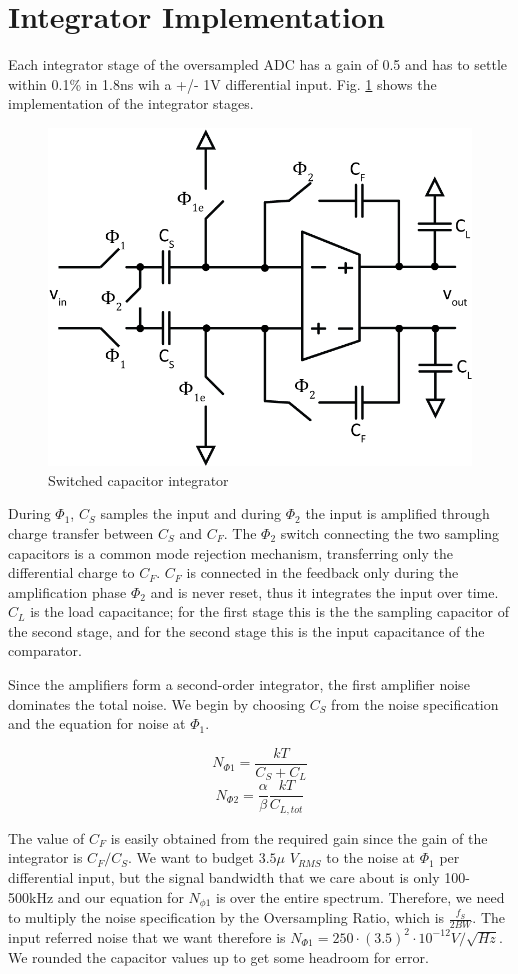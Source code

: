 \documentclass[conference]{IEEEtran}
\begin{document}
\section{Integrator Implementation}

Each integrator stage of the oversampled ADC has a gain of 0.5 and has to settle within 0.1\% in 1.8ns wih a +/- 1V differential input. Fig. \ref{fig:int} shows the implementation of the integrator stages.

\begin{figure}[h]
\centering
\includegraphics[width=0.75\linewidth]{illus/integrator}
\caption{Switched capacitor integrator}
\label{fig:int}
\end{figure}

During $\Phi_1$, $C_S$ samples the input and during $\Phi_2$ the input is amplified through charge transfer between $C_S$ and $C_F$. The $\Phi_2$ switch connecting the two sampling capacitors is a common mode rejection mechanism, transferring only the differential charge to $C_F$. $C_F$ is connected in the feedback only during the amplification phase $\Phi_2$ and is never reset, thus it integrates the input over time. $C_L$ is the load capacitance; for the first stage this is the the sampling capacitor of the second stage, and for the second stage this is the input capacitance of the comparator.

Since the amplifiers form a second-order integrator, the first amplifier noise dominates the total noise. We begin by choosing $C_S$ from the noise specification and the equation for noise at $\Phi_1$. 

$$N_{\Phi 1} = \frac{kT}{C_S + C_L}$$
$$N_{\Phi 2} = \frac{\alpha}{\beta}\frac{kT}{C_{L,tot}}$$

The value of $C_F$ is easily obtained from the required gain since the gain of the integrator is $C_F/C_S$. We want to budget $3.5 \mu$ $V_{RMS}$ to the noise at $\Phi_1$ per differential input, but the signal bandwidth that we care about is only 100-500kHz and our equation for $N_{\phi 1}$ is over the entire spectrum. Therefore, we need to multiply the noise specification by the Oversampling Ratio, which is $\frac{f_S}{2BW}$. The input referred noise that we want therefore is $N_{\Phi 1}=250 \cdot (3.5)^2 \cdot 10^{-12} V/\sqrt{Hz}$. We rounded the capacitor values up to get some headroom for error.
\end{document}
